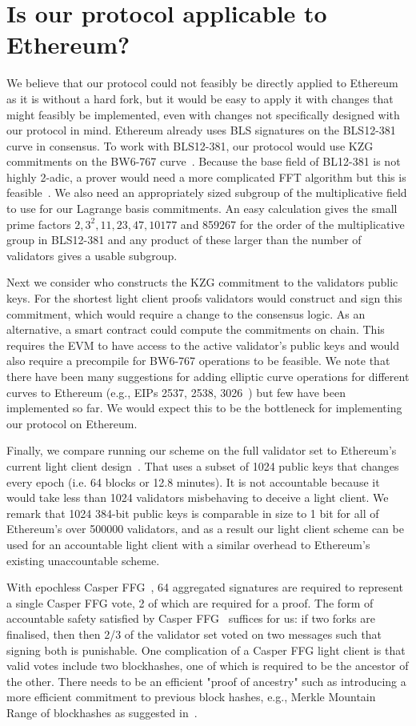\section{Is our protocol applicable to Ethereum?} \label{sec:ethereum}

We believe that our protocol could not feasibly be directly applied to Ethereum as it is without a hard fork, but it would be easy to apply it with changes that might feasibly be implemented, 
even with changes not specifically designed with our protocol in mind. Ethereum already uses BLS signatures on the BLS12-381 curve in consensus. To work with BLS12-381, 
our protocol would use KZG commitments on the BW6-767 curve~\cite{bw6767}. Because the base field of BL12-381 is not highly 2-adic, a prover would need a more complicated FFT algorithm 
but this is feasible~\cite{bw6767}. We also need an appropriately sized subgroup of the multiplicative field to use for our Lagrange basis commitments. An easy calculation gives the small prime factors $2,3^2,11,23,47,10177$ and 859267 for the order of the multiplicative group in BLS12-381 and any product of these larger than the number of validators gives a usable subgroup.
 
 Next we consider who constructs the KZG commitment to the validators public keys. For the shortest light client proofs validators would construct and sign this commitment, which would require a change to the consensus logic. As an alternative, a smart contract could compute the commitments on chain.
 This requires the EVM to have access to the active validator's public keys and would also require a precompile for BW6-767 operations to be feasible.
 We note that there have been many suggestions for adding elliptic curve operations for different curves to Ethereum (e.g., EIPs 2537, 2538, 3026~\cite{EIPs}) but few have been implemented so far.
 We would expect this to be the bottleneck for implementing our protocol on Ethereum.
 
 Finally, we compare running our scheme on the full validator set to Ethereum's current light client design~\cite{ethlight}.
 That uses a subset of 1024 public keys that changes every epoch (i.e. 64 blocks or 12.8 minutes). It is not accountable because it would take less than 1024 validators misbehaving to deceive a light client. We remark that 1024 384-bit public keys is comparable in size to 1 bit for all of Ethereum's over 500000 validators, and as a result our light client scheme can be used for an accountable light client with a similar overhead to Ethereum's existing unaccountable scheme.

 With epochless Casper FFG~\cite{Gasper}, 64 aggregated signatures are required to represent a single Casper FFG vote, 2 of which are required for a proof. The form of accountable safety satisfied by Casper FFG~\cite{CasperFFG} suffices for us: if two forks are finalised, then then 2/3 of the validator set voted on two messages such that signing both is punishable.  One complication of a Casper FFG light client is that valid votes include two blockhashes, one of which is required to be the ancestor of the other. There needs to be an efficient "proof of ancestry" such as introducing a more efficient commitment to previous block hashes, e.g., Merkle Mountain Range of blockhashes as suggested in~\cite{flyclient}.
